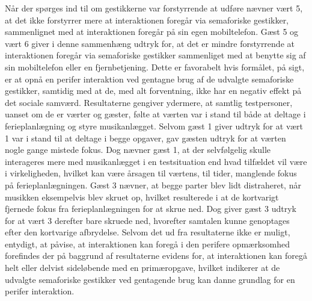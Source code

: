 Når der spørges ind til om gestikkerne var forstyrrende at udføre nævner vært 5, at det ikke forstyrrer mere at interaktionen foregår via semaforiske gestikker, sammenlignet med at interaktionen foregår på sin egen mobiltelefon. Gæst 5 og vært 6 giver i denne sammenhæng udtryk for, at det er mindre forstyrrende at interaktionen foregår via semaforiske gestikker sammenliget med at benytte sig af sin mobiltelefon eller en fjernbetjening. Dette er favorabelt hvis formålet, på sigt, er at opnå en perifer interaktion ved gentagne brug af de udvalgte semaforiske gestikker, samtidig med at de, med alt forventning, ikke har en negativ effekt på det sociale samværd. \blankline
%
Resultaterne gengiver ydermere, at samtlig testpersoner, uanset om de er værter og gæster, følte at værten var i stand til både at deltage i ferieplanlægning og styre musikanlægget. Selvom gæst 1 giver udtryk for at vært 1 var i stand til at deltage i begge opgaver, gav gæsten udtryk for at værten nogle gange mistede fokus. Dog nævner gæst 1, at der selvfølgelig skulle interageres mere med musikanlægget i en testsituation end hvad tilfældet vil være i virkeligheden, hvilket kan være årsagen til værtens, til tider, manglende fokus på ferieplanlægningen. Gæst 3 nævner, at begge parter blev lidt distraheret, når musikken eksempelvis blev skruet op, hvilket resulterede i at de kortvarigt fjernede fokus fra ferieplanlægningen for at skrue ned. Dog giver gæst 3 udtryk for at vært 3 derefter bare skruede ned, hvorefter samtalen kunne genoptages efter den kortvarige afbrydelse. \blankline
%
Selvom det ud fra resultaterne ikke er muligt, entydigt, at påvise, at interaktionen kan foregå i den perifere opmærksomhed forefindes der på baggrund af resultaterne evidens for, at interaktionen kan foregå helt eller delvist sideløbende med en primæropgave, hvilket indikerer at de udvalgte semaforiske gestikker ved gentagende brug kan danne grundlag for en perifer interaktion.

